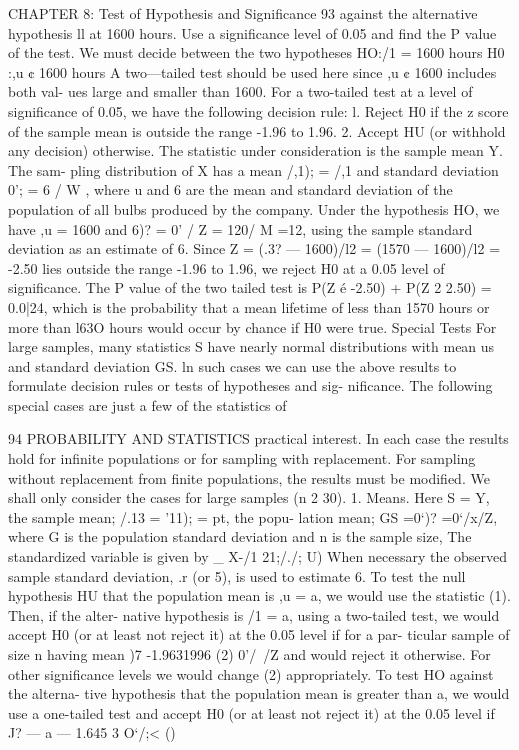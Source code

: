 CHAPTER 8: Test of Hypothesis and Significance 93
against the alternative hypothesis ll at 1600 hours. Use a signiﬁcance
level of 0.05 and ﬁnd the P value of the test.
We must decide between the two hypotheses
HO:/1 = 1600 hours H0 :,u ¢ 1600 hours
A two—tailed test should be used here since ,u ¢ 1600 includes both val-
ues large and smaller than 1600.
For a two-tailed test at a level of signiﬁcance of 0.05, we have the
following decision rule:
l. Reject H0 if the z score of the sample mean is outside the range
-1.96 to 1.96.
2. Accept HU (or withhold any decision) otherwise.
The statistic under consideration is the sample mean Y. The sam-
pling distribution of X has a mean /,1); = /,1 and standard deviation
0'; = 6 / W , where u and 6 are the mean and standard deviation of the
population of all bulbs produced by the company.
Under the hypothesis HO, we have ,u = 1600 and 6)? = 0' / \/Z = 120/
M =12, using the sample standard deviation as an estimate of 6.
Since Z = (.3? — 1600)/l2 = (1570 — 1600)/l2 = -2.50 lies outside the
range -1.96 to 1.96, we reject H0 at a 0.05 level of signiﬁcance.
The P value of the two tailed test is P(Z é -2.50) + P(Z 2 2.50) =
0.0|24, which is the probability that a mean lifetime of less than 1570
hours or more than l63O hours would occur by chance if H0 were true.
Special Tests
For large samples, many statistics S have nearly normal distributions
with mean us and standard deviation GS. ln such cases we can use the
above results to formulate decision rules or tests of hypotheses and sig-
niﬁcance. The following special cases are just a few of the statistics of



94 PROBABILITY AND STATISTICS
practical interest. In each case the results hold for inﬁnite populations or
for sampling with replacement. For sampling without replacement from
ﬁnite populations, the results must be modiﬁed. We shall only consider
the cases for large samples (n 2 30).
1. Means. Here S = Y, the sample mean; /.13 = '11); = pt, the popu-
lation mean; GS =0‘)? =0‘/x/Z, where G is the population
standard deviation and n is the sample size, The standardized
variable is given by
_ X-/1
21;/./; U)
When necessary the observed sample standard deviation, .r (or
5), is used to estimate 6.
To test the null hypothesis HU that the population
mean is ,u = a, we would use the statistic (1). Then, if the alter-
native hypothesis is /1 = a, using a two-tailed test, we would
accept H0 (or at least not reject it) at the 0.05 level if for a par-
ticular sample of size n having mean )7
-1.9631996 (2)
0'/~/Z
and would reject it otherwise. For other signiﬁcance levels we
would change (2) appropriately. To test HO against the alterna-
tive hypothesis that the population mean is greater than a, we
would use a one-tailed test and accept H0 (or at least not reject
it) at the 0.05 level if
J? — a
— 1.645 3
O‘/\/;< ()



